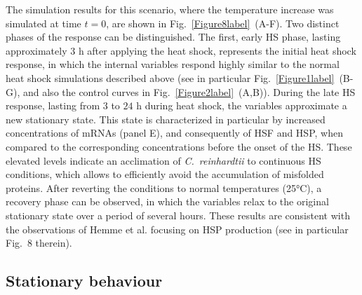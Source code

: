 \documentclass[oneside, 10pt, a4paper, twocolumn]{article}
\begin{document}
The simulation results for this scenario, where the temperature increase was simulated at time $t=0$, are shown in Fig.~\ref{Figure8label}~(A-F).
Two distinct phases of the response can be distinguished. The first, early HS phase, lasting approximately $3$ h after applying the heat shock, 
represents the initial heat shock response, in which the internal variables respond highly similar to 
the normal heat shock simulations described above (see in particular Fig.~\ref{Figure1label}~(B-G), and also the control curves in Fig.~\ref{Figure2label}~(A,B)). 
During the late HS response, lasting from $3$ to $24$ h during heat shock, the variables approximate 
a new stationary state.  
This state is characterized in particular by increased concentrations of mRNAs (panel E), and consequently 
of HSF and HSP, when compared to the corresponding concentrations before the onset of the HS. 
These elevated levels indicate an acclimation of \textit{C.~reinhardtii} to continuous HS conditions,
which allows to efficiently avoid the accumulation of misfolded proteins.
After reverting the conditions to normal temperatures (25°C), a recovery phase can be observed, in which
the variables relax to the original stationary state over a period of several hours.
These results are consistent with the observations of Hemme et al. \cite{Hemme2014} focusing on HSP production (see in particular Fig.~8 therein).









\subsection{Stationary behaviour}
\label{SecSteadyStateConcentrations}
\end{document}
